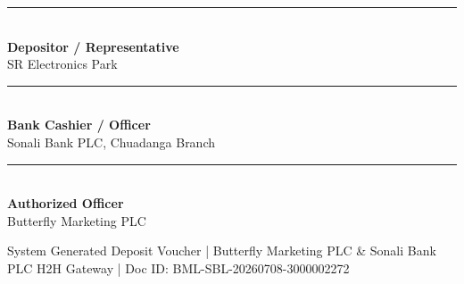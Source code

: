 \documentclass[11pt, a4paper]{article}
\begin{document}
\vspace{25pt}

\begin{minipage}{0.32\textwidth}
  \centering
  \rule{0.8\textwidth}{0.5pt} \\
  \vspace{3pt}
  \small \textbf{Depositor / Representative} \\
  \tiny SR Electronics Park
\end{minipage} %
\begin{minipage}{0.32\textwidth}
  \centering
  \rule{0.8\textwidth}{0.5pt} \\
  \vspace{3pt}
  \small \textbf{Bank Cashier / Officer} \\
  \tiny Sonali Bank PLC, Chuadanga Branch
\end{minipage} %
\begin{minipage}{0.32\textwidth}
  \centering
  \rule{0.8\textwidth}{0.5pt} \\
  \vspace{3pt}
  \small \textbf{Authorized Officer} \\
  \tiny Butterfly Marketing PLC
\end{minipage}

\vfill
\centerline{\tiny \color{gray} System Generated Deposit Voucher | Butterfly Marketing PLC \& Sonali Bank PLC H2H Gateway | Doc ID: BML-SBL-20260708-3000002272}
\end{document}
